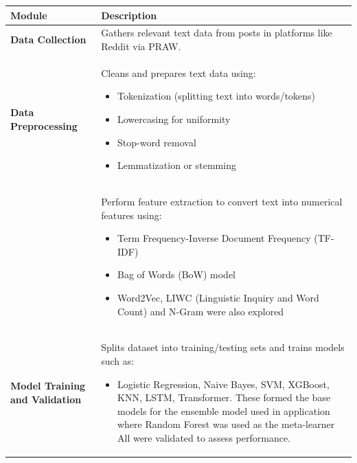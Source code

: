 \begin{table}[H]
    \centering
    \renewcommand{\arraystretch}{1.2} %
    \small %
    \begin{tabularx}{\textwidth}{|p{3.5cm}|X|}
        \hline
        \rowcolor{lightestgray}
        \textbf{Module} & \textbf{Description} \\
        \hline
        \textbf{Data Collection} & Gathers relevant text data from posts in platforms like Reddit via PRAW. \\
        \hline
        \textbf{Data Preprocessing} & Cleans and prepares text data using:
        \begin{itemize}
            \setlength{\itemsep}{0pt}  %
            \setlength{\parskip}{0pt}
            \item Tokenization (splitting text into words/tokens)
            \item Lowercasing for uniformity
            \item Stop-word removal
            \item Lemmatization or stemming
        \end{itemize} \\
        \textbf{} & Perform feature extraction to convert text into numerical features using:
        \begin{itemize}
            \setlength{\itemsep}{0pt}  %
            \setlength{\parskip}{0pt}
            \item Term Frequency-Inverse Document Frequency (TF-IDF)
            \item Bag of Words (BoW) model
            \item Word2Vec, LIWC (Linguistic Inquiry and Word Count) and N-Gram were also explored
        \end{itemize} \\
        \hline
        \textbf{Model Training and Validation} & Splits dataset into training/testing sets and trains models such as:
        \setlength{\itemsep}{0pt}  %
        \setlength{\parskip}{0pt}
        \begin{itemize}
            \item Logistic Regression, Naive Bayes, SVM, XGBoost, KNN, LSTM, Transformer. These formed the base models for the ensemble model used in application where Random Forest was used as the meta-learner All were validated to assess performance.

\end{itemize}
\end{tabularx}
\end{table}

